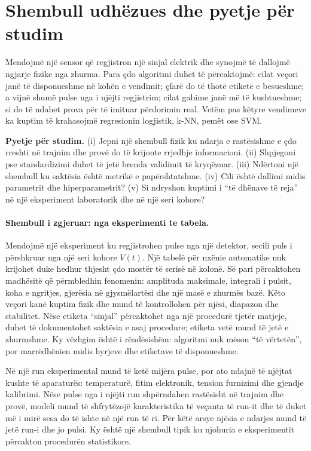 \documentclass[12pt,a4paper,oneside]{book}
\begin{document}
\section{Shembull udhëzues dhe pyetje për studim}

Mendojmë një sensor që regjistron një sinjal elektrik dhe synojmë të dallojmë ngjarje fizike nga zhurma. Para çdo algoritmi duhet të përcaktojmë: cilat veçori janë të disponueshme në kohën e vendimit; çfarë do të thotë etiketë e besueshme; a vijnë shumë pulse nga i njëjti regjistrim; cilat gabime janë më të kushtueshme; si do të ndahet prova për të imituar përdorimin real. Vetëm pas këtyre vendimeve ka kuptim të krahasojmë regresionin logjistik, k-NN, pemët ose SVM.

\textbf{Pyetje për studim.} (i) Jepni një shembull fizik ku ndarja e rastësishme e çdo rreshti në trajnim dhe provë do të krijonte rrjedhje informacioni. (ii) Shpjegoni pse standardizimi duhet të jetë brenda validimit të kryqëzuar. (iii) Ndërtoni një shembull ku saktësia është metrikë e papërshtatshme. (iv) Cili është dallimi midis parametrit dhe hiperparametrit? (v) Si ndryshon kuptimi i ``të dhënave të reja'' në një eksperiment laboratorik dhe në një seri kohore?


\paragraph{Shembull i zgjeruar: nga eksperimenti te tabela.}
Mendojmë një eksperiment ku regjistrohen pulse nga një detektor, secili puls i përshkruar nga një seri kohore $V(t)$. Një tabelë për nxënie automatike nuk krijohet duke hedhur thjesht çdo mostër të serisë në kolonë. Së pari përcaktohen madhësitë që përmbledhin fenomenin: amplituda maksimale, integrali i pulsit, koha e ngritjes, gjerësia në gjysmëlartësi dhe një masë e zhurmës bazë. Këto veçori kanë kuptim fizik dhe mund të kontrollohen për njësi, diapazon dhe stabilitet. Nëse etiketa ``sinjal'' përcaktohet nga një procedurë tjetër matjeje, duhet të dokumentohet saktësia e asaj procedure; etiketa vetë mund të jetë e zhurmshme. Ky vëzhgim është i rëndësishëm: algoritmi nuk mëson ``të vërtetën'', por marrëdhënien midis hyrjeve dhe etiketave të disponueshme.

Në një run eksperimental mund të ketë mijëra pulse, por ato ndajnë të njëjtat kushte të aparaturës: temperaturë, fitim elektronik, tension furnizimi dhe gjendje kalibrimi. Nëse pulse nga i njëjti run shpërndahen rastësisht në trajnim dhe provë, modeli mund të shfrytëzojë karakteristika të veçanta të run-it dhe të duket më i mirë sesa do të ishte në një run të ri. Për këtë arsye njësia e ndarjes mund të jetë run-i dhe jo pulsi. Ky është një shembull tipik ku njohuria e eksperimentit përcakton procedurën statistikore.
\end{document}
